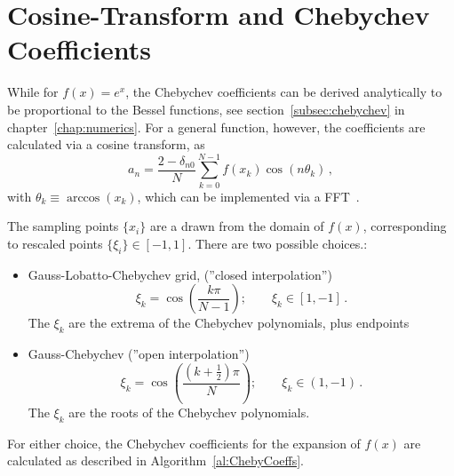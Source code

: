 \section{Cosine-Transform and Chebychev Coefficients}

While for $f(x) = e^{x}$, the Chebychev coefficients can be derived analytically
to be proportional to the Bessel functions, see
section~\ref{subsec:chebychev} in chapter~\ref{chap:numerics}. For a general
function, however, the coefficients are calculated via a cosine transform,
as~\cite{NdongJCP09}
\begin{equation}
  a_n = \frac{2 - \delta_{n0}}{N} \sum_{k=0}^{N-1} f(x_k) \cos(n \theta_k)\,,
\end{equation}
with $\theta_k \equiv \arccos(x_k)$, which can be implemented via a
FFT~\cite{RaoDCTBook1990}.

The sampling points $\{x_i\}$ are a drawn from the domain of $f(x)$,
corresponding to rescaled points $\{\xi_i\} \in [-1,1]$. There are two possible
choices.:
\begin{itemize}
  \item Gauss-Lobatto-Chebychev grid,
        (''closed interpolation'')
  \begin{equation}
    \xi_k = \cos\left( \frac{k \pi}{N-1}
                \right); \qquad \xi_k \in [1, -1]\,.
    \label{eq:gauss_lobatto}
  \end{equation}
  The $\xi_k$ are the extrema of the Chebychev polynomials, plus
  endpoints
  \item Gauss-Chebychev (''open interpolation'')
  \begin{equation}
    \xi_k = \cos\left( \frac{\left(k + \frac{1}{2}\right) \pi}{N}
                \right); \qquad \xi_k \in (1, -1)\,.
    \label{eq:gauss_cheby}
  \end{equation}
  The $\xi_k$ are the roots of the Chebychev polynomials.
\end{itemize}
For either choice, the Chebychev coefficients for the expansion of $f(x)$ are
calculated as described in Algorithm~\ref{al:ChebyCoeffs}.

